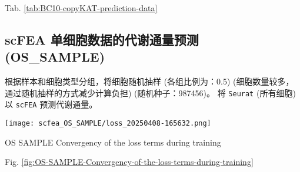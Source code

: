 \documentclass[
]{article}
\begin{document}
\begin{center}\vspace{1.5cm}\end{center}

Tab. \ref{tab:BC10-copyKAT-prediction-data}

\begin{center}\vspace{1.5cm}\end{center}

\begin{center}\vspace{1.5cm}\end{center}

\hypertarget{scfea-ux5355ux7ec6ux80deux6570ux636eux7684ux4ee3ux8c22ux901aux91cfux9884ux6d4b-os_sample}{%
\subsection{scFEA 单细胞数据的代谢通量预测 (OS\_SAMPLE)}\label{scfea-ux5355ux7ec6ux80deux6570ux636eux7684ux4ee3ux8c22ux901aux91cfux9884ux6d4b-os_sample}}

根据样本和细胞类型分组，将细胞随机抽样 (各组比例为：0.5) (细胞数量较多，通过随机抽样的方式减少计算负担) (随机种子：987456)。
将 \texttt{Seurat} (所有细胞) 以 \texttt{scFEA} 预测代谢通量。

\begin{center}\vspace{1.5cm}\end{center}
\def\@captype{figure}
\begin{center}
\texttt{[image: scfea\_OS\_SAMPLE/loss\_20250408-165632.png]}
\caption{OS SAMPLE Convergency of the loss terms during training}\label{fig:OS-SAMPLE-Convergency-of-the-loss-terms-during-training}
\end{center}

\begin{center}\vspace{1.5cm}\end{center}

Fig. \ref{fig:OS-SAMPLE-Convergency-of-the-loss-terms-during-training}

\begin{center}\vspace{1.5cm}\end{center}
\end{document}
